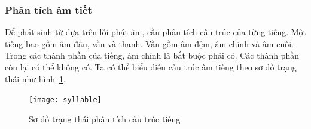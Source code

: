 \documentclass[a4paper,oneside,14pt]{extbook} %
\begin{document}


\subsubsection{Phân tích âm tiết}
\label{sec:realword:syllable}

Để phát sinh từ dựa trên lỗi phát âm, cần phân tích cấu trúc của từng
tiếng. Một tiếng bao gồm âm đầu, vần và thanh. Vần gồm âm đệm, âm
chính và âm cuối. Trong các thành phần của tiếng, âm chính là bắt buộc
phải có. Các thành phần còn lại có thể không có. Ta có thể biểu diễn
cấu trúc âm tiếng theo sơ đồ trạng thái như hình~\ref{fig:syllable}.

\begin{figure}[htbp]
  \centering
  \texttt{[image: syllable]}
  \caption{Sơ đồ trạng thái phân tích cấu trúc tiếng}
  \label{fig:syllable}
\end{figure}
\end{document}
